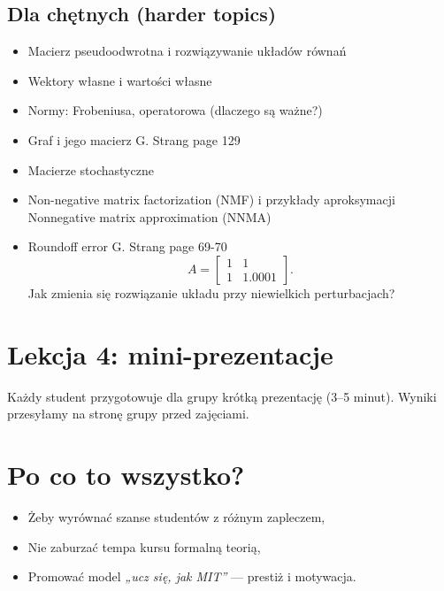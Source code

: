 \documentclass[12pt]{article}
\begin{document}
\subsection*{Dla chętnych (harder topics)}
\begin{itemize}[label=$\diamond$]

\item Macierz pseudoodwrotna i rozwiązywanie układów równań
\item Wektory własne i wartości własne 
\item Normy: Frobeniusa, operatorowa (dlaczego są ważne?)
\item Graf i jego macierz G. Strang page 129
\item Macierze stochastyczne
\item Non-negative matrix factorization (NMF) i przykłady aproksymacji
Nonnegative matrix approximation (NNMA)

\item Roundoff error G. Strang page 69-70
\[
A=\begin{bmatrix}1 & 1\\ 1 & 1.0001\end{bmatrix}.
\]
     Jak zmienia się rozwiązanie układu przy niewielkich perturbacjach?
    

\end{itemize}


\vspace{1em}
\section*{Lekcja 4: mini-prezentacje}
Każdy student przygotowuje dla grupy krótką prezentację (3–5 minut).  
Wyniki przesyłamy na stronę grupy przed zajęciami.

\vspace{1em}
\section*{Po co to wszystko?}
\begin{itemize}
  \item Żeby wyrównać szanse studentów z różnym zapleczem,
  \item Nie zaburzać tempa kursu formalną teorią,
  \item Promować model \emph{„ucz się, jak MIT”} — prestiż i motywacja.
\end{itemize}
\end{document}
